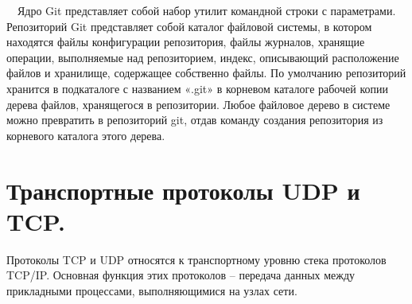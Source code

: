 \documentclass{article}
\begin{document}
\begin{figure}[h]
\end{figure}

~\
Ядро Git представляет собой набор утилит командной строки с параметрами.
Репозиторий Git представляет собой каталог файловой системы, в котором находятся файлы конфигурации репозитория, файлы журналов, хранящие операции, выполняемые над репозиторием, индекс, описывающий расположение файлов и хранилище, содержащее собственно файлы. По умолчанию репозиторий хранится в подкаталоге с названием «.git» в корневом каталоге рабочей копии дерева файлов, хранящегося в репозитории. Любое файловое дерево в системе можно превратить в репозиторий git, отдав команду создания репозитория из корневого каталога этого дерева.

\newpage

\section{\textbf{\large Транспортные протоколы UDP и TCP.}}

Протоколы TCP и UDP относятся к транспортному уровню стека протоколов TCP/IP.
Основная функция этих протоколов – передача данных между прикладными
процессами, выполняющимися на узлах сети.
\end{document}
